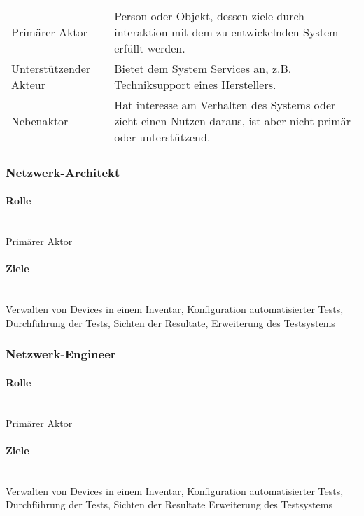 \documentclass[
	ngerman,
	toc=listof, %
	toc=bibliography, %
	footnotes=multiple, %
	parskip=half, %
	numbers=noendperiod %
]{scrartcl}
\begin{document}
		\begin{tabularx}{\textwidth}{lX}
			\toprule
				Primärer Aktor & Person oder Objekt, dessen ziele durch interaktion mit dem zu entwickelnden System erfüllt werden.\\
				Unterstützender Akteur & Bietet dem System Services an, z.B. Techniksupport eines Herstellers.\\
				Nebenaktor & Hat interesse am Verhalten des Systems oder zieht einen Nutzen daraus, ist aber nicht primär oder unterstützend. \\
			\bottomrule
		\end{tabularx}

		\subsubsection{Netzwerk-Architekt}
		
			\paragraph{Rolle} ~\\
			Primärer Aktor 

			\paragraph{Ziele} ~\\
			Verwalten von Devices in einem Inventar, 
			Konfiguration automatisierter Tests, 
			Durchführung der Tests, 
			Sichten der Resultate,
			Erweiterung des Testsystems
			
		\subsubsection{Netzwerk-Engineer}
		
			\paragraph{Rolle} ~\\
			Primärer Aktor 

			\paragraph{Ziele} ~\\
			Verwalten von Devices in einem Inventar, 
			Konfiguration automatisierter Tests, 
			Durchführung der Tests, 
			Sichten der Resultate
			Erweiterung des Testsystems
			\newpage
\end{document}
